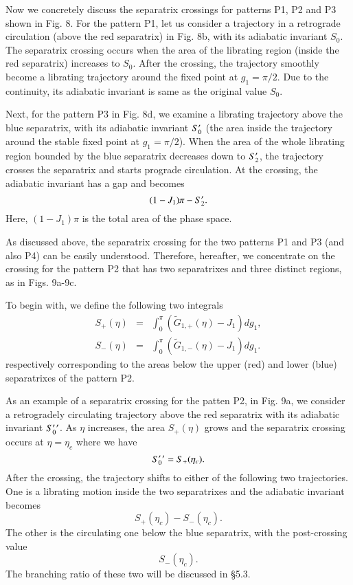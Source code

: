 \documentclass[useAMS,usenatbib,twocolumn]{mn2e}
\newcommand{\beq}{\begin{equation}}
\newcommand{\beqa}{\begin{eqnarray}}
\newcommand{\eeq}{\end{equation}}
\newcommand{\eeqa}{\end{eqnarray}}
\begin{document}
Now we concretely discuss the separatrix crossings for patterns P1, P2 and P3 shown in Fig. 8.
For the pattern P1, let us consider a trajectory in a retrograde circulation  (above the red separatrix) in Fig. 8b, with its adiabatic invariant $S_0$. The separatrix crossing occurs when the area of the librating region (inside the red separatrix) increases to $S_0$.  After the crossing, the trajectory smoothly become a librating trajectory around the fixed point at $g_1=\pi/2$. Due to the continuity, its adiabatic invariant is same as the original value $S_0$.

Next, for the pattern P3 in Fig. 8d,  we examine a librating trajectory above the blue separatrix, with its adiabatic invariant $S_0\rq{}$
 (the area inside the trajectory around the stable fixed point at $g_1=\pi/2$).
When the area of the whole librating region bounded by the blue separatrix decreases down to $S_2\rq{}$, the trajectory crosses the separatrix and starts prograde circulation.  At the crossing,  the adiabatic invariant has a gap and becomes 
\beq
(1-J_1)\pi-S_2\rq{}.  \label{sa}
\eeq
 Here, $(1-J_1)\pi$ is the total area of the phase space.

As discussed above, the separatrix crossing for the two patterns P1 and P3 (and also P4) can be easily understood. Therefore, hereafter, we concentrate on the crossing for the pattern P2 that has two separatrixes and three distinct regions, as in Figs. 9a-9c. 



To begin with, we define the following two integrals
\beqa
S_{+}(\eta)&=&\int_{0}^{\pi} (\tilde{G}_{1,+}(\eta) - J_1) dg_{1},\\
S_{-}(\eta)&=&\int_{0}^{\pi} (\tilde{G}_{1, -}(\eta) - J_1) dg_{1}.
\eeqa
respectively corresponding to the areas below the upper (red) and lower (blue) separatrixes of the pattern P2.


As an example of a separatrix crossing for the patten P2,  in Fig. 9a, 
we consider a retrogradely circulating trajectory above the red separatrix with its adiabatic invariant $S_0\rq{}\rq{}$.  As $\eta$ increases, the area $S_+(\eta)$ grows and the separatrix crossing occurs at $\eta=\eta_c$ where we have
\beq
S_0\rq{}\rq{}=S_+(\eta_c). \label{scross}
\eeq
After the crossing, the trajectory  shifts to either of the following two trajectories. One is a librating motion inside the two separatrixes and the adiabatic invariant becomes 
\beq
S_+(\eta_c)-S_-(\eta_c). \label{lib}
\eeq
The other is the circulating one below the blue separatrix, with the post-crossing value
\beq
S_-(\eta_c). \label{und}
\eeq
The branching ratio of these two will be discussed in \S 5.3. 
\end{document}
